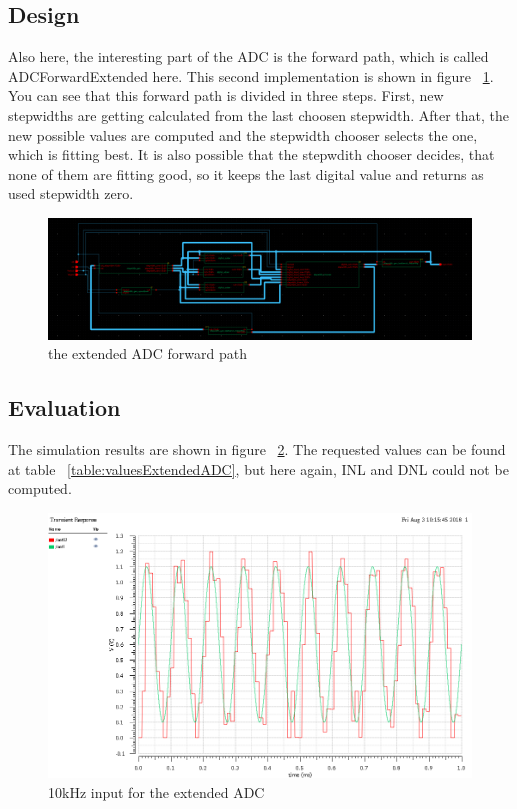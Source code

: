 \subsection{Design}
Also here, the interesting part of the ADC is the forward path, which is called ADCForwardExtended here. This second implementation is shown in figure ~\ref{fig:extendedForward}. You can see that this forward path is divided in three steps. First, new stepwidths are getting calculated from the last choosen stepwidth. After that, the new possible values are computed and the stepwidth chooser selects the one, which is fitting best. It is also possible that the stepwdith chooser decides, that none of them are fitting good, so it keeps the last digital value and returns as used stepwidth zero.

\begin{figure}[h]
	\centering
	\includegraphics[scale=0.225]{images/adc/adcForwardExtended.png}
	\caption{the extended ADC forward path}
	\label{fig:extendedForward}
\end{figure}


\subsection{Evaluation}

The simulation results are shown in figure ~\ref{fig:extendedAdcEvaluation}. The requested values can be found at table ~\ref{table:valuesExtendedADC}, but here again, INL and DNL could not be computed.


\begin{figure}[h]
	\centering
	\includegraphics[scale=0.5]{images/adc/input10kHzExtended.png}
	\caption{10kHz input for the extended ADC}
	\label{fig:extendedAdcEvaluation}
\end{figure}

